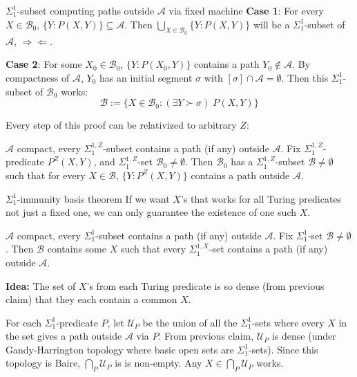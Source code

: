 \begin{frame}{$\Sigma_1^1$-subset computing paths outside
$\mathcal{A}$ via fixed machine}
  \textbf{Case 1}: For every $X\in\mathcal{B}_0$,
  $\{Y:P(X,Y)\}\subseteq\mathcal{A}$. Then $\bigcup_{X\in\mathcal{B}_0}
  \{Y:P(X,Y)\}$ will be a $\Sigma_1^1$-subset of $\mathcal{A}$,
  $\Rightarrow\Leftarrow$.

  \vspace{1em}
  \textbf{Case 2}: For some $X_0\in\mathcal{B}_0$, $\{Y:P(X_0,Y)\}$
  contains a path $Y_0\not\in\mathcal{A}$. By compactness of $\mathcal{A}$,
  $Y_0$ has an initial segment $\sigma$ with $[\sigma]\cap\mathcal{A}
  =\emptyset$. Then this $\Sigma_1^1$-subset of $\mathcal{B}_0$ works:
  \[\mathcal{B}:= \{X\in\mathcal{B}_0: (\exists Y\succ\sigma)\; P(X,Y)\}\]

  Every step of this proof can be relativized to arbitrary $Z$:
  \begin{claim}[Relativized to $Z$]
    $\mathcal{A}$ compact, every $\Sigma_1^{1,Z}$-subset contains a
    path (if any) outside $\mathcal{A}$. Fix $\Sigma_1^{1,Z}$-predicate
    $P^Z(X,Y)$, and $\Sigma_1^{1,Z}$-set $\mathcal{B}_0\neq\emptyset$. Then
    $\mathcal{B}_0$ has a $\Sigma_1^{1,Z}$-subset $\mathcal{B}\neq\emptyset$
    such that for every $X\in\mathcal{B}$, $\{Y:P^Z(X,Y)\}$ contains a path
    outside $\mathcal{A}$.
  \end{claim}
\end{frame}

\begin{frame}{$\Sigma_1^1$-immunity basis theorem}
  If we want $X$'s that works for all Turing predicates not just a fixed
  one, we can only guarantee the existence of one such $X$.

  \begin{thm}
    $\mathcal{A}$ compact, every $\Sigma_1^{1}$-subset contains a path (if
    any) outside $\mathcal{A}$. Fix $\Sigma_1^{1}$-set
    $\mathcal{B}\neq\emptyset$. Then $\mathcal{B}$ contains some $X$ such
    that every $\Sigma_1^{1,X}$-set contains a path (if any) outside
    $\mathcal{A}$.
  \end{thm}

  \textbf{Idea:} The set of $X$'s from each Turing predicate is so dense
  (from previous claim) that they each contain a common $X$.

  \vspace{0.5em}
  For each $\Sigma_1^1$-predicate $P$, let $\mathcal{U}_P$ be the union of
  all the $\Sigma_1^1$-sets where every $X$ in the set gives a path outside
  $\mathcal{A}$ via $P$. From previous claim, $\mathcal{U}_P$ is dense
  (under Gandy-Harrington topology where basic open sets are
  $\Sigma_1^1$-sets). Since this topology is Baire,
  $\bigcap_P\mathcal{U}_P$ is is non-empty. Any
  $X\in\bigcap_P\mathcal{U}_P$ works.
\end{frame}


